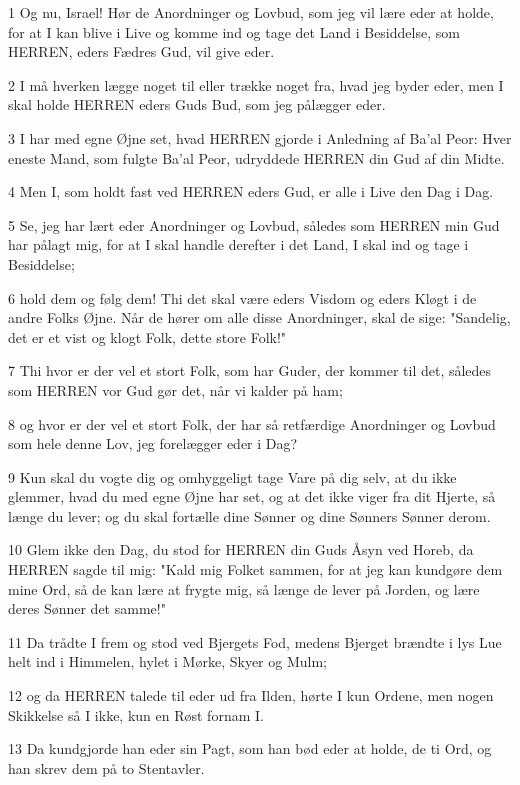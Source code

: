 \par 1 Og nu, Israel! Hør de Anordninger og Lovbud, som jeg vil lære eder at holde, for at I kan blive i Live og komme ind og tage det Land i Besiddelse, som HERREN, eders Fædres Gud, vil give eder.
\par 2 I må hverken lægge noget til eller trække noget fra, hvad jeg byder eder, men I skal holde HERREN eders Guds Bud, som jeg pålægger eder.
\par 3 I har med egne Øjne set, hvad HERREN gjorde i Anledning af Ba'al Peor: Hver eneste Mand, som fulgte Ba'al Peor, udryddede HERREN din Gud af din Midte.
\par 4 Men I, som holdt fast ved HERREN eders Gud, er alle i Live den Dag i Dag.
\par 5 Se, jeg har lært eder Anordninger og Lovbud, således som HERREN min Gud har pålagt mig, for at I skal handle derefter i det Land, I skal ind og tage i Besiddelse;
\par 6 hold dem og følg dem! Thi det skal være eders Visdom og eders Kløgt i de andre Folks Øjne. Når de hører om alle disse Anordninger, skal de sige: "Sandelig, det er et vist og klogt Folk, dette store Folk!"
\par 7 Thi hvor er der vel et stort Folk, som har Guder, der kommer til det, således som HERREN vor Gud gør det, når vi kalder på ham;
\par 8 og hvor er der vel et stort Folk, der har så retfærdige Anordninger og Lovbud som hele denne Lov, jeg forelægger eder i Dag?
\par 9 Kun skal du vogte dig og omhyggeligt tage Vare på dig selv, at du ikke glemmer, hvad du med egne Øjne har set, og at det ikke viger fra dit Hjerte, så længe du lever; og du skal fortælle dine Sønner og dine Sønners Sønner derom.
\par 10 Glem ikke den Dag, du stod for HERREN din Guds Åsyn ved Horeb, da HERREN sagde til mig: "Kald mig Folket sammen, for at jeg kan kundgøre dem mine Ord, så de kan lære at frygte mig, så længe de lever på Jorden, og lære deres Sønner det samme!"
\par 11 Da trådte I frem og stod ved Bjergets Fod, medens Bjerget brændte i lys Lue helt ind i Himmelen, hylet i Mørke, Skyer og Mulm;
\par 12 og da HERREN talede til eder ud fra Ilden, hørte I kun Ordene, men nogen Skikkelse så I ikke, kun en Røst fornam I.
\par 13 Da kundgjorde han eder sin Pagt, som han bød eder at holde, de ti Ord, og han skrev dem på to Stentavler.

